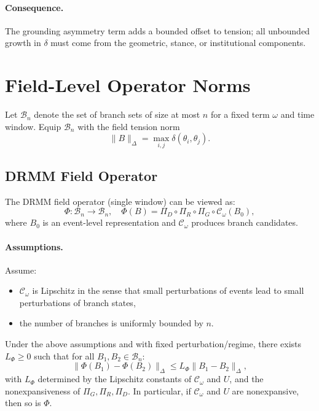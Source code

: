 \documentclass[11pt, a4paper]{article}
\begin{document}
\paragraph{Consequence.}
The grounding asymmetry term adds a bounded offset to tension; all unbounded growth in $\delta$ must come from the geometric, stance, or institutional components.

\section{Field-Level Operator Norms}

Let $\mathcal{B}_n$ denote the set of branch sets of size at most $n$ for a fixed term $\omega$ and time window.
Equip $\mathcal{B}_n$ with the field tension norm
\[
\|B\|_{\Delta} = \max_{i,j} \delta(\theta_i,\theta_j).
\]

\subsection{DRMM Field Operator}

The DRMM field operator (single window) can be viewed as:
\[
\Phi : \mathcal{B}_n \to \mathcal{B}_n, \quad
\Phi(B) = \Pi_D \circ \Pi_R \circ \Pi_G \circ \mathcal{C}_\omega(B_0),
\]
where $B_0$ is an event-level representation and $\mathcal{C}_\omega$ produces branch candidates.

\paragraph{Assumptions.}
Assume:
\begin{itemize}[nosep]
  \item $\mathcal{C}_\omega$ is Lipschitz in the sense that small perturbations of events lead to small perturbations of branch states,
  \item the number of branches is uniformly bounded by $n$.
\end{itemize}

\begin{proposition}
Under the above assumptions and with fixed perturbation/regime,
there exists $L_\Phi \ge 0$ such that for all $B_1,B_2 \in \mathcal{B}_n$:
\[
\|\Phi(B_1) - \Phi(B_2)\|_{\Delta}
\le L_\Phi \|B_1 - B_2\|_{\Delta},
\]
with $L_\Phi$ determined by the Lipschitz constants of $\mathcal{C}_\omega$ and $U$, and the nonexpansiveness of $\Pi_G,\Pi_R,\Pi_D$.
In particular, if $\mathcal{C}_\omega$ and $U$ are nonexpansive, then so is $\Phi$.
\end{proposition}
\end{document}
